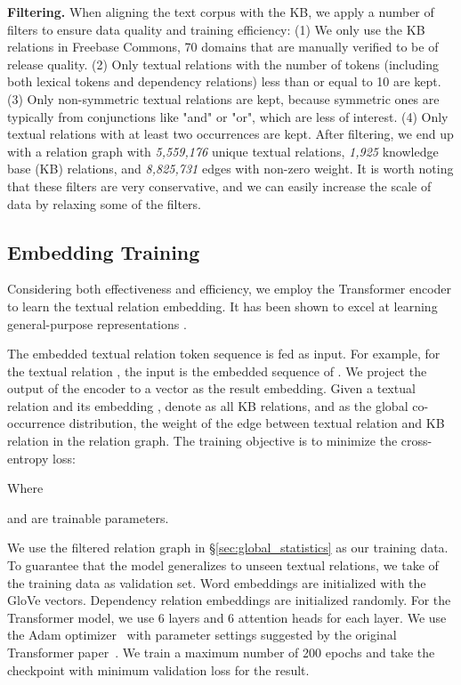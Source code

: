 \documentclass[11pt,a4paper]{article}
\newcommand{\nop}[1]{}
\begin{document}
\textbf{Filtering.} When aligning the text corpus with the KB, we apply a number of filters to ensure data quality and training efficiency: (1) We only use the KB relations in Freebase Commons, 70 domains that are manually verified to be of release quality. (2) Only textual relations with the number of tokens (including both lexical tokens and dependency relations) less than or equal to 10 are kept. (3) Only non-symmetric textual relations are kept, because symmetric ones are typically from conjunctions like "and" or "or", which are less of interest. (4) Only textual relations with at least two occurrences are kept. After filtering, we end up with a relation graph with \emph{5,559,176} unique textual relations, \emph{1,925} knowledge base (KB) relations, and \emph{8,825,731} edges with non-zero weight. It is worth noting that these filters are very conservative, and we can easily increase the scale of data by relaxing some of the filters.  

\nop{We extracted 788036618 sentences from ClueWeb09 and linked them to 2667688 unique entities. Each sentence contains at least two entities. }
\subsection{Embedding Training}
\label{sec:embedding_model}
Considering both effectiveness and efficiency, we employ the Transformer encoder \cite{vaswani2017attention} to learn the textual relation embedding. It has been shown to excel at learning general-purpose representations \cite{devlin2018bert}.

The embedded textual relation token sequence is fed as input. For example, for the textual relation , the input is the embedded sequence of . We project the output of the encoder to a vector  as the result embedding.
Given a textual relation  and its embedding , denote  as all KB relations, and  as the global co-occurrence distribution, the weight of the edge between textual relation  and KB relation  in the relation graph.
The training objective is to minimize the cross-entropy loss:

Where 

 and  are trainable parameters. 

We use the filtered relation graph in \S\ref{sec:global_statistics} as our training data. To guarantee that the model generalizes to unseen textual relations, we take  of the training data as validation set. Word embeddings are initialized with the GloVe \cite{pennington2014glove} vectors\footnotemark. Dependency relation embeddings are initialized randomly. 
For the Transformer model, we use 6 layers and 6 attention heads for each layer. We use the Adam optimizer~\cite{kingma2014adam} with parameter settings suggested by the original Transformer paper~\cite{vaswani2017attention}. We train a maximum number of 200 epochs and take the checkpoint with minimum validation loss for the result. 
\end{document}
